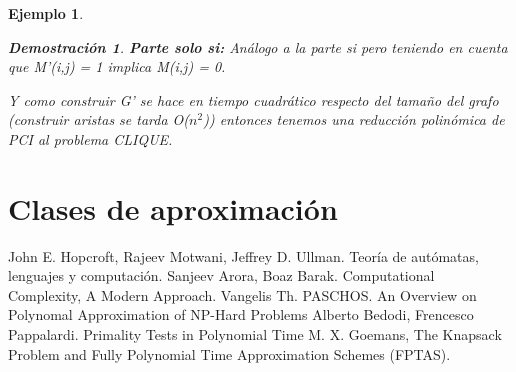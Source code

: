 \documentclass[a4paper,12pt,titlepage]{article}
\newtheorem{eje}{Ejemplo}[section]
\newtheorem*{dem}{\textbf{Demostraci\'on}}
\begin{document}
\begin{eje}
\begin{dem}
\vspace{\baselineskip}

\textbf{Parte solo si:} An\'alogo a la parte si pero teniendo en cuenta que M'(i,j) = 1 implica M(i,j) = 0.

\vspace{\baselineskip}

Y como construir G' se hace en tiempo cuadr\'atico respecto del tamaño del grafo (construir aristas se tarda O($n^2$)) entonces tenemos una reducci\'on polin\'omica de PCI al problema CLIQUE.

\end{dem}

\end{eje}

\section{Clases de aproximaci\'on}

\newpage

\begin{thebibliography}{0}
   John E. Hopcroft, Rajeev Motwani, Jeffrey D. Ullman. Teor\'ia de aut\'omatas, lenguajes y computaci\'on.
   Sanjeev Arora, Boaz Barak. Computational Complexity, A Modern Approach.
   Vangelis Th. PASCHOS. An Overview on Polynomal Approximation of NP-Hard Problems
   Alberto Bedodi, Frencesco Pappalardi. Primality Tests in Polynomial Time
   M. X. Goemans, The Knapsack Problem and Fully Polynomial Time Approximation Schemes (FPTAS).
\end{thebibliography}
\end{document}
